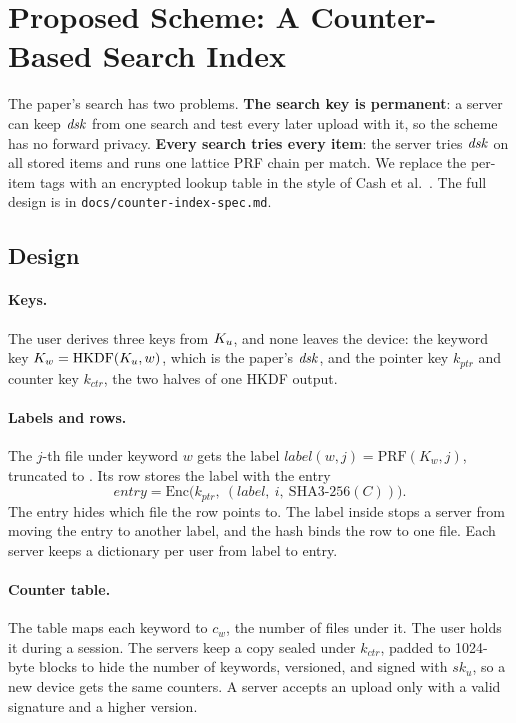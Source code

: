 \section{Proposed Scheme: A Counter-Based Search Index}
\label{sec:counter-index}

The paper's search has two problems. \textbf{The search key is permanent}: a server can keep $\mathit{dsk}$ from one search
and test every later upload with it, so the scheme has no forward privacy. \textbf{Every search tries every item}:
the server tries $\mathit{dsk}$ on all stored items and runs one lattice PRF chain per match. We replace the per-item tags
with an encrypted lookup table in the style of Cash et al.~\cite{cash2014dynamic}. The full design is in
\texttt{docs/counter-index-spec.md}.

\subsection{Design}

\paragraph{Keys.} The user derives three keys from $K_u$, and none leaves the device: the keyword key
$K_w = \mathrm{HKDF}(K_u, w)$, which is the paper's $\mathit{dsk}$, and the pointer key $k_{ptr}$ and counter key $k_{ctr}$,
the two halves of one HKDF output.

\paragraph{Labels and rows.} The $j$-th file under keyword $w$ gets the label
$\mathit{label}(w, j) = \mathrm{PRF}(K_w, j)$, truncated to \CiLabelBytes. Its row stores the label with the entry
\[
\mathit{entry} = \mathrm{Enc}\big(k_{ptr},\ (\mathit{label},\ i,\ \mathrm{SHA3\text{-}256}(C))\big).
\]
The entry hides which file the row points to. The label inside stops a server from moving the entry to another
label, and the hash binds the row to one file. Each server keeps a dictionary per user from label to entry.

\paragraph{Counter table.} The table maps each keyword to $c_w$, the number of files under it. The user holds it
during a session. The servers keep a copy sealed under $k_{ctr}$, padded to 1024-byte blocks to hide the number of
keywords, versioned, and signed with $sk_u$, so a new device gets the same counters. A server accepts an upload only
with a valid signature and a higher version.

